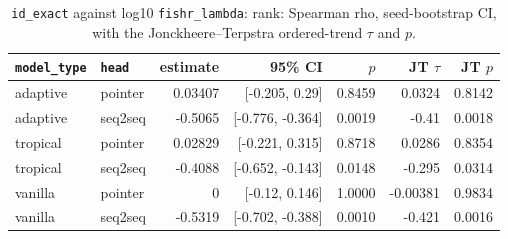 \documentclass[10pt]{article}
\begin{document}
{\small
\begin{longtable}{llrrrrr}
\caption{\texttt{id\_exact} against log10 \texttt{fishr\_lambda}: rank: Spearman rho, seed-bootstrap CI, with the Jonckheere--Terpstra ordered-trend $\tau$ and $p$.}\label{tab:trend-id_exact}\\
\toprule
\texttt{model\_type} & \texttt{head} & estimate & 95\% CI & $p$ & JT $\tau$ & JT $p$\\
\midrule
\endhead
adaptive & pointer & 0.03407 & [-0.205, 0.29] & 0.8459 & 0.0324 & 0.8142\\
adaptive & seq2seq & -0.5065 & [-0.776, -0.364] & 0.0019 & -0.41 & 0.0018\\
tropical & pointer & 0.02829 & [-0.221, 0.315] & 0.8718 & 0.0286 & 0.8354\\
tropical & seq2seq & -0.4088 & [-0.652, -0.143] & 0.0148 & -0.295 & 0.0314\\
vanilla & pointer & 0 & [-0.12, 0.146] & 1.0000 & -0.00381 & 0.9834\\
vanilla & seq2seq & -0.5319 & [-0.702, -0.388] & 0.0010 & -0.421 & 0.0016\\
\bottomrule
\end{longtable}
}
\end{document}
